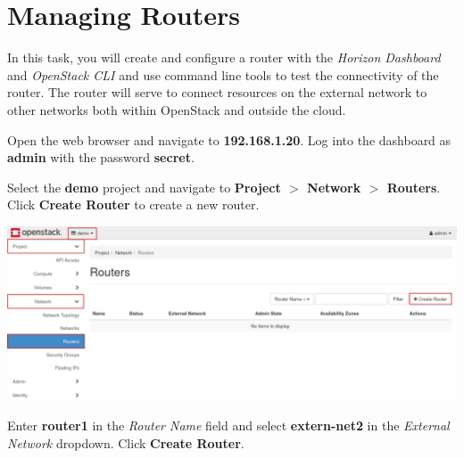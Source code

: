 \documentclass[letterpaper, 12pt]{article}
\begin{document}
\section{Managing Routers}\label{sec:managing-routers}
In this task, you will create and configure a router with the \textit{Horizon Dashboard} and \textit{OpenStack CLI} and use command line tools to test the connectivity of the router.
The router will serve to connect resources on the external network to other networks both within OpenStack and outside the cloud.

\begin{enumerate}
    \begin{labstep}
        Open the web browser and navigate to \textbf{192.168.1.20}.
        Log into the dashboard as \textbf{admin} with the password \textbf{secret}.
    \end{labstep}

    \begin{labstep}
        Select the \textbf{demo} project and navigate to \textbf{Project $>$ Network $>$ Routers}.
        Click \textbf{Create Router} to create a new router.

        \begin{center}
            \includegraphics[width=\linewidth]{images/part2/step2.png}
        \end{center}
    \end{labstep}

    \begin{labstep}
        Enter \textbf{router1} in the \textit{Router Name} field and select \textbf{extern-net2} in the \textit{External Network} dropdown.
        Click \textbf{Create Router}.


\end{labstep}
\end{enumerate}
\end{document}
